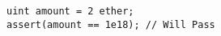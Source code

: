 \begin{lstlisting}[language=Solidity]
uint amount = 2 ether;
assert(amount == 1e18); // Will Pass

\end{lstlisting}